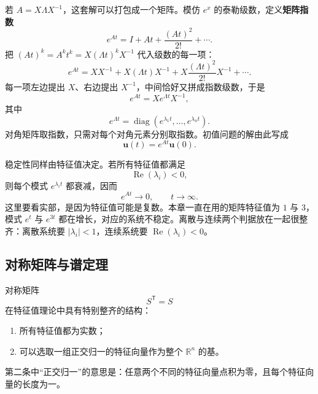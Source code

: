 \documentclass[UTF8,a4paper,12pt]{ctexart}
\numberwithin{equation}{section}
\newcommand{\R}{\mathbb{R}}
\newcommand{\trans}{^{\mathsf T}}
\begin{document}
	若 $A=X\Lambda X^{-1}$，这套解可以打包成一个矩阵。模仿 $e^x$ 的泰勒级数，定义\textbf{矩阵指数}
	\begin{equation}\label{eq:7.49}
	e^{At}
	=I+At+\frac{(At)^2}{2!}+\cdots.
	\end{equation}
	把 $(At)^k=A^kt^k=X(\Lambda t)^kX^{-1}$ 代入级数的每一项：
	\begin{equation}\label{eq:7.50}
	e^{At}
	=XX^{-1}+X(\Lambda t)X^{-1}+X\frac{(\Lambda t)^2}{2!}X^{-1}+\cdots.
	\end{equation}
	每一项左边提出 $X$、右边提出 $X^{-1}$，中间恰好又拼成指数级数，于是
	\begin{equation}\label{eq:7.51}
	\boxed{e^{At}=Xe^{\Lambda t}X^{-1},}
	\end{equation}
	其中
	\begin{equation}\label{eq:7.52}
	e^{\Lambda t}
	=
	\operatorname{diag}(e^{\lambda_1t},\ldots,e^{\lambda_nt}).
	\end{equation}
	对角矩阵取指数，只需对每个对角元素分别取指数。初值问题的解由此写成
	\begin{equation}\label{eq:7.53}
	\bm{u}(t)=e^{At}\bm{u}(0).
	\end{equation}

	稳定性同样由特征值决定。若所有特征值都满足
	\begin{equation}\label{eq:7.54}
	\operatorname{Re}(\lambda_i)<0,
	\end{equation}
	则每个模式 $e^{\lambda_i t}$ 都衰减，因而
	\begin{equation}\label{eq:7.55}
	e^{At}\to 0,
	\qquad t\to\infty.
	\end{equation}
	这里要看实部，是因为特征值可能是复数。本章一直在用的矩阵特征值为 $1$ 与 $3$，模式 $e^{t}$ 与 $e^{3t}$ 都在增长，对应的系统不稳定。离散与连续两个判据放在一起很整齐：离散系统要 $|\lambda_i|<1$，连续系统要 $\operatorname{Re}(\lambda_i)<0$。

	\subsection{对称矩阵与谱定理}

	对称矩阵
	\begin{equation}\label{eq:7.56}
	S\trans=S
	\end{equation}
	在特征值理论中具有特别整齐的结构：
	\begin{enumerate}
		\item 所有特征值都为实数；
		\item 可以选取一组正交归一的特征向量作为整个 $\R^n$ 的基。
	\end{enumerate}
	第二条中“正交归一”的意思是：任意两个不同的特征向量点积为零，且每个特征向量的长度为一。
\end{document}

